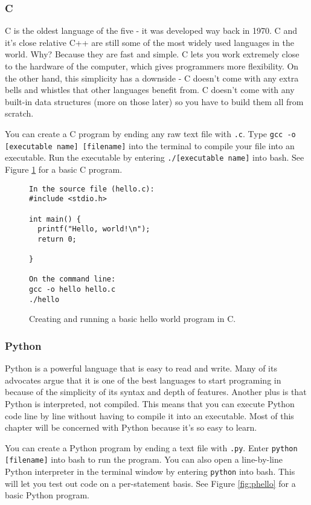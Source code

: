 \documentclass[a4paper]{article}
\begin{document}
\subsubsection{C}
C is the oldest language of the five - it was developed way back in 1970. C and it's close relative C++ are still some of the most widely used languages in the world. Why? Because they are fast and simple. C lets you work extremely close to the hardware of the computer, which gives programmers more flexibility. On the other hand, this simplicity has a downside - C doesn't come with any extra bells and whistles that other languages benefit from. C doesn't come with any built-in data structures (more on those later) so you have to build them all from scratch.

You \ex can create a C program by ending any raw text file with \texttt{.c}. Type \texttt{gcc -o [executable name] [filename]} into the terminal to compile your file into an executable. Run the executable by entering \texttt{./[executable name]} into bash. See Figure \ref{fig:chello} for a basic C program.


\begin{figure}
\begin{center}
\begin{verbatim}
In the source file (hello.c):
#include <stdio.h>

int main() {
  printf("Hello, world!\n");
  return 0;

}

On the command line:
gcc -o hello hello.c
./hello
\end{verbatim}
\caption{\label{fig:chello} Creating and running a basic hello world program in C.}
\end{center}\end{figure}


\subsubsection{Python}

Python is a powerful language that is easy to read and write. Many of its advocates argue that it is one of the best languages to start programing in because of the simplicity of its syntax and depth of features. Another plus is that Python is interpreted, not compiled. This means that you can execute Python code line by line without having to compile it into an executable. Most of this chapter will be concerned with Python because it's so easy to learn.

You \ex can create a Python program by ending a text file with \texttt{.py}. Enter \texttt{python [filename]} into bash to run the program. You can also open a line-by-line Python interpreter in the terminal window by entering \texttt{python} into bash. This will let you test out code on a per-statement basis. See Figure \ref{fig:phello} for a basic Python program.
\end{document}
